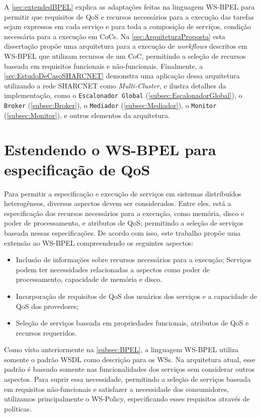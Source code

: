 \documentclass[12pt]{report} %
\begin{document}
    A \autoref{sec:extendedBPEL} explica as adaptações feitas na linguagem WS-BPEL para permitir que requisitos de QoS e recursos necessários para a execução das tarefas sejam expressos em cada serviço e para toda a composição de serviços, condição necessária para a execução em CoCs.
    Na \autoref{sec:ArquiteturaProposta} esta dissertação propõe uma arquitetura para a execução de \textit{workflows} descritos em WS-BPEL que utilizam recursos de um CoC, permitindo a seleção de recursos baseada em requisitos funcionais e não-funcionais.
    Finalmente, a \autoref{sec:EstudoDeCasoSHARCNET} demonstra uma aplicação dessa arquitetura utilizando a rede SHARCNET como \textit{Multi-Cluster}, e ilustra detalhes da implementação, como o \texttt{Escalonador Global} (\autoref{subsec:EscalonadorGlobal}), o \texttt{Broker} (\autoref{subsec:Broker}), o \texttt{Mediador} (\autoref{subsec:Mediador}), o \texttt{Monitor} (\autoref{subsec:Monitor}), e outros elementos da arquitetura.

    \section{Estendendo o WS-BPEL para especificação de QoS}
    \label{sec:extendedBPEL}
	Para permitir a especificação e execução de serviços em sistemas distribuídos heterogêneos, diversos aspectos devem ser considerados.
	Entre eles, está a especificação dos recursos necessários para a execução, como memória, disco e poder de processamento, e atributos de QoS; permitindo a seleção de serviços baseada nessas especificações.
	De acordo com isso, este trabalho propõe uma extensão ao WS-BPEL compreendendo os seguintes aspectos:

	\begin{itemize}
	    \item Inclusão de informações sobre recursos necessários para a execução;
		  Serviços podem ter necessidades relacionadas a aspectos como poder de processamento, capacidade de memória e disco.
	    \item Incorporação de requisitos de QoS dos usuários dos serviços e a capacidade de QoS dos provedores;
	    \item Seleção de serviços baseada em propriedades funcionais, atributos de QoS e recursos requeridos.
	\end{itemize}  

	Como visto anteriormente na \autoref{subsec:BPEL}, a linguagem WS-BPEL utiliza somente o padrão WSDL como descrição para os WSs.
	Na arquitetura atual, esse padrão é baseado somente nas funcionalidades dos serviços sem considerar outros aspectos.
	Para suprir essa necessidade, permitindo a seleção de serviços baseada em requisitos não-funcionais e satisfazer a necessidade dos consumidores, utilizamos principalmente o WS-Policy, especificando esses requisitos através de políticas.
	
\end{document}
